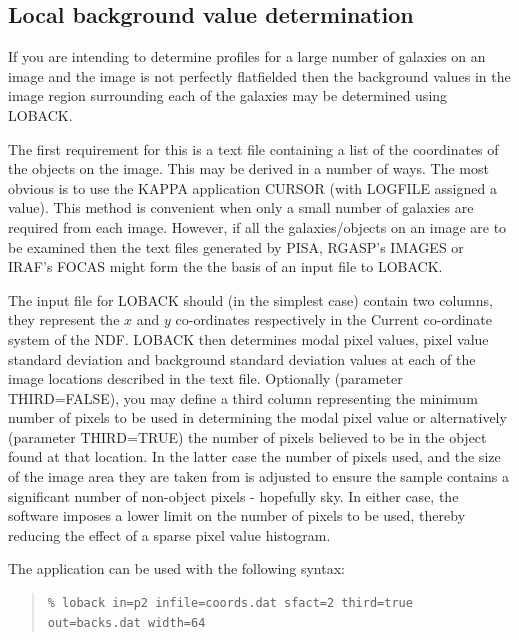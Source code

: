 \documentclass[twoside,11pt]{article}
\newcommand{\xref}[3]{#1}
\newcommand{\xlabel}[1]{}
\newenvironment{myquote}{\begin{quote}\begin{small}}{\end{small}\end{quote}}
\begin{document}
\subsection{Local background value determination}
\xlabel{LOCALBACKGROUNDS}

If you are intending to determine profiles for a large number of
galaxies on an image and the image is not perfectly flatfielded
then the background values in the image region surrounding
each of the galaxies may be determined using LOBACK.

The first requirement for this is a text file containing a list of the
coordinates of the objects on the image. This may be derived
in a number of ways. The most obvious is to use the \xref{KAPPA}{sun95}{} application
CURSOR (with LOGFILE assigned a value). This method is convenient
when only a small number of galaxies are required from each image.
However, if all the galaxies/objects on an image are to be examined then
the text files generated by \xref{PISA}{sun109}{}, RGASP's IMAGES or
\xref{IRAF}{sun109}{}'s FOCAS might
form the the basis of an input file to LOBACK.

The input file for LOBACK should (in the simplest case) contain two
columns, they represent the $x$ and $y$ co-ordinates respectively
in the Current co-ordinate system of the NDF.
LOBACK then determines modal pixel values, pixel value standard deviation
and background standard deviation
values at each of the image locations described in the text file. Optionally
(parameter THIRD=FALSE),
you may define a third column representing the minimum number
of pixels to be used in determining the modal pixel value or alternatively
(parameter THIRD=TRUE) the number of pixels believed to be in the object found
at that location. In the latter case the number of pixels used, and the
size of the image area they are taken from is adjusted to ensure the sample
contains a significant number of non-object pixels - hopefully sky.
In either case, the software imposes a lower limit on the number of pixels
to be used, thereby reducing the effect of a sparse pixel value histogram.

The application can be used with the following syntax:

\begin{myquote}
\begin{verbatim}
% loback in=p2 infile=coords.dat sfact=2 third=true out=backs.dat width=64
\end{verbatim}
\end{myquote}
\end{document}

